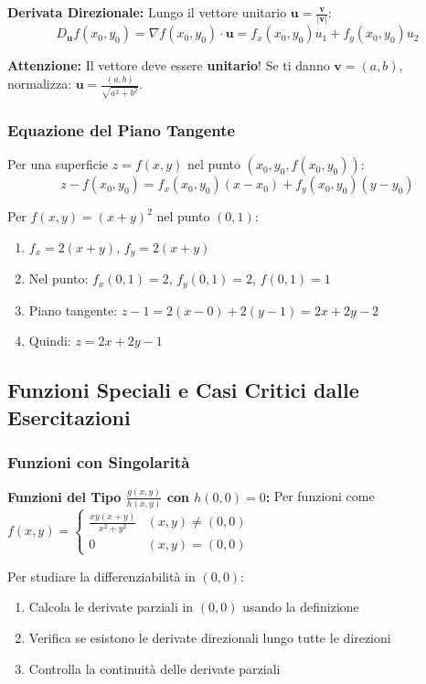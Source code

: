 \begin{strategia}
\textbf{Derivata Direzionale:} Lungo il vettore unitario $\mathbf{u} = \frac{\mathbf{v}}{|\mathbf{v}|}$:
\[ D_{\mathbf{u}}f(x_0,y_0) = \nabla f(x_0,y_0) \cdot \mathbf{u} = f_x(x_0,y_0) u_1 + f_y(x_0,y_0) u_2 \]

\textbf{Attenzione:} Il vettore deve essere \textbf{unitario}! Se ti danno $\mathbf{v} = (a,b)$, normalizza: $\mathbf{u} = \frac{(a,b)}{\sqrt{a^2+b^2}}$.
\end{strategia}

\subsubsection{Equazione del Piano Tangente}

Per una superficie $z = f(x,y)$ nel punto $(x_0, y_0, f(x_0,y_0))$:
\[ z - f(x_0,y_0) = f_x(x_0,y_0)(x-x_0) + f_y(x_0,y_0)(y-y_0) \]

\begin{esempio}
Per $f(x,y) = (x+y)^2$ nel punto $(0,1)$:
\begin{enumerate}
    \item $f_x = 2(x+y)$, $f_y = 2(x+y)$
    \item Nel punto: $f_x(0,1) = 2$, $f_y(0,1) = 2$, $f(0,1) = 1$
    \item Piano tangente: $z - 1 = 2(x-0) + 2(y-1) = 2x + 2y - 2$
    \item Quindi: $z = 2x + 2y - 1$
\end{enumerate}
\end{esempio}

\subsection{Funzioni Speciali e Casi Critici dalle Esercitazioni}

\subsubsection{Funzioni con Singolarità}

\begin{info}
\textbf{Funzioni del Tipo $\frac{g(x,y)}{h(x,y)}$ con $h(0,0) = 0$:}
Per funzioni come $f(x,y) = \begin{cases}\frac{xy(x+y)}{x^{2}+y^{2}} & (x,y)\ne(0,0)\\ 0 & (x,y)=(0,0)\end{cases}$

Per studiare la differenziabilità in $(0,0)$:
\begin{enumerate}
    \item Calcola le derivate parziali in $(0,0)$ usando la definizione
    \item Verifica se esistono le derivate direzionali lungo tutte le direzioni
    \item Controlla la continuità delle derivate parziali
\end{enumerate}
\end{info}

